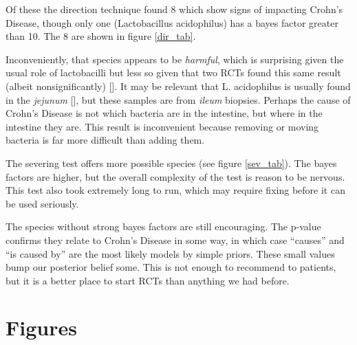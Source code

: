 \documentclass[letterpaper]{article}
\begin{document}
Of these the direction technique found 8 which show signs of impacting
Crohn's Disease, though only one (Lactobacillus acidophilus) has a
bayes factor greater than 10.  The 8 are shown in figure \ref{dir_tab}.

Inconveniently, that species appears to
be \textit{harmful}, which is surprising given the usual role of
lactobacilli but less so given that two RCTs found this same result
(albeit nonsignificantly) [\cite{lgg1,lgg2}].  It may be relevant that
L. acidophilus is usually found in the
\textit{jejunum} [\cite{lacid}], but these samples are from
\textit{ileum} biopsies.  Perhaps the cause of Crohn's Disease is not
which bacteria are in the intestine, but where in the intestine they
are.  This result is inconvenient because removing or moving bacteria
is far more difficult than adding them.

The severing test offers more possible species (see figure
\ref{sev_tab}).  The bayes factors are higher, but the overall
complexity of the test is reason to be nervous.  This test also took
extremely long to run, which may require fixing before it can be used
seriously.

The species without strong bayes factors are still encouraging.  The
p-value confirms they relate to Crohn's Disease in some way, in which
case ``causes'' and ``is caused by'' are the most likely models by
simple priors.  These small values bump our posterior belief some.
This is not enough to recommend to patients, but it is a better place
to start RCTs than anything we had before.

\newpage

\printbibliography

\newpage
\onecolumn
\section{Figures}
\end{document}
